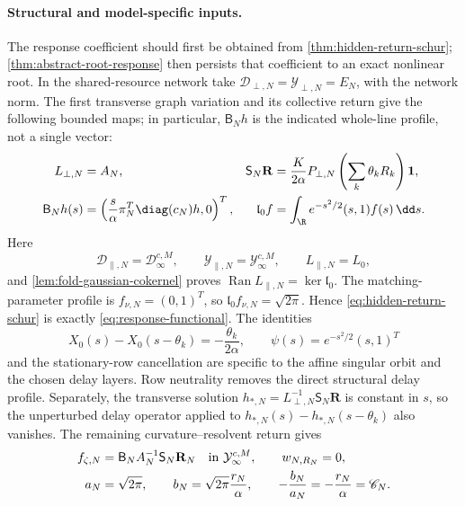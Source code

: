 \paragraph{Structural and model-specific inputs.}
The response coefficient should first be obtained from
\cref{thm:hidden-return-schur}; \cref{thm:abstract-root-response} then
persists that coefficient to an exact nonlinear root.  In the shared-resource
network take
\(\mathcal D_{\perp,N}=\mathcal Y_{\perp,N}=E_N\), with the network norm.
The first transverse graph variation and its collective return give the
following bounded maps; in particular, \(\mathsf B_Nh\) is the indicated
whole-line profile, not a single vector:
\begin{align}
 L_{\perp,N}&=A_N,&
 \mathsf S_N\mathbf R
 &=\frac{K}{2\alpha}P_{\perp,N}
      \left(\sum_k\theta_kR_k\right)\mathbf1,\notag\\
 \mathsf B_Nh(s)&=\left(\frac{s}{\alpha}
             \pi_N^T\diag(c_N)h,0\right)^T,&
 \mathfrak l_0f&=\int_{\R}e^{-s^2/2}(s,1)f(s)\,\dd s.   \label{eq:abstract-schur-dictionary}
\end{align}
Here
\begin{equation}
 \mathcal D_{\parallel,N}=\mathcal D_\infty^{c,M},\qquad
 \mathcal Y_{\parallel,N}=\mathcal Y_\infty^{c,M},\qquad
 L_{\parallel,N}=L_0,                                 \label{eq:abstract-collective-dictionary}
\end{equation}
and \cref{lem:fold-gaussian-cokernel} proves
\(\operatorname{Ran}L_{\parallel,N}=\ker\mathfrak l_0\).  The
matching-parameter profile is \(f_{\nu,N}=(0,1)^T\), so
\(\mathfrak l_0f_{\nu,N}=\sqrt{2\pi}\).  Hence
\cref{eq:hidden-return-schur} is exactly
\cref{eq:response-functional}.  The identities
\[
 X_0(s)-X_0(s-\theta_k)=-\frac{\theta_k}{2\alpha},
 \qquad
 \psi(s)=e^{-s^2/2}(s,1)^T
\]
and the stationary-row cancellation are specific to the affine singular
orbit and the chosen delay layers.  Row neutrality removes the direct
structural delay profile.  Separately, the transverse solution
\(h_{*,N}=L_{\perp,N}^{-1}\mathsf S_N\mathbf R\) is constant in \(s\), so
the unperturbed delay operator applied to
\(h_{*,N}(s)-h_{*,N}(s-\theta_k)\) also vanishes.  The remaining
curvature--resolvent return gives
\begin{align}
 f_{\zeta,N}
 &=\mathsf B_NA_N^{-1}\mathsf S_N\mathbf R_N
   \quad\text{in }\mathcal Y_\infty^{c,M},
   \qquad w_{N,R_N}=0,\notag\\
 a_N&=\sqrt{2\pi},\qquad
 b_N=\sqrt{2\pi}\frac{r_N}{\alpha},\qquad
 -\frac{b_N}{a_N}=-\frac{r_N}{\alpha}=\mathscr C_N.
 \label{eq:abstract-current-dictionary}
\end{align}
